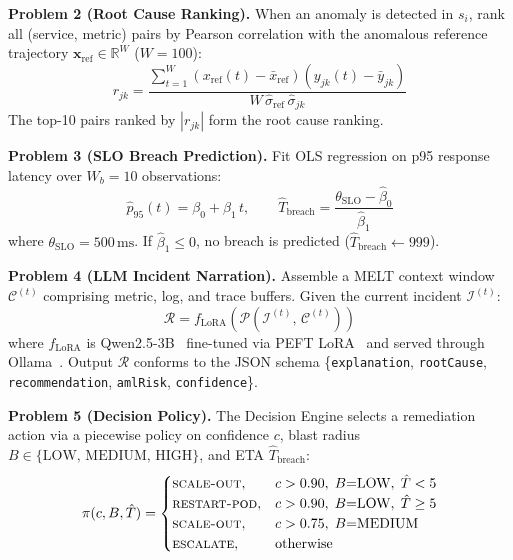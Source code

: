\documentclass[a4paper]{lipics-v2021}
\newcommand{\mypara}[1]{{\vspace{0.1mm}\noindent\textbf{#1}}}
\begin{document}
\mypara{Problem 2 (Root Cause Ranking).}
When an anomaly is detected in $s_i$, rank all (service, metric) pairs by Pearson
correlation with the anomalous reference trajectory
$\mathbf{x}_{\text{ref}} \in \mathbb{R}^W$ ($W{=}100$):
\begin{equation}
    r_{jk} = \frac{\displaystyle\sum_{t=1}^{W}\!\left(x_{\text{ref}}(t) -
    \bar{x}_{\text{ref}}\right)\!\left(y_{jk}(t) - \bar{y}_{jk}\right)}
    {W\,\hat{\sigma}_{\text{ref}}\,\hat{\sigma}_{jk}}
    \label{eq:rca}
\end{equation}
The top-10 pairs ranked by $|r_{jk}|$ form the root cause ranking.

\mypara{Problem 3 (SLO Breach Prediction).}
Fit OLS regression on p95 response latency over $W_b{=}10$ observations:
\begin{equation}
    \hat{p}_{95}(t) = \beta_0 + \beta_1\,t, \qquad
    \hat{T}_{\text{breach}} = \frac{\theta_{\text{SLO}} - \hat{\beta}_0}{\hat{\beta}_1}
    \label{eq:breach}
\end{equation}
where $\theta_{\text{SLO}} = 500\,\text{ms}$. If $\hat{\beta}_1 \leq 0$, no breach
is predicted ($\hat{T}_{\text{breach}} \leftarrow 999$).

\mypara{Problem 4 (LLM Incident Narration).}
Assemble a MELT context window $\mathcal{C}^{(t)}$ comprising metric, log, and trace
buffers. Given the current incident $\mathcal{I}^{(t)}$:
\begin{equation}
    \mathcal{R} = f_{\text{LoRA}}\!\left(\mathcal{P}\!\left(\mathcal{I}^{(t)},\,
    \mathcal{C}^{(t)}\right)\right)
    \label{eq:llm}
\end{equation}
where $f_{\text{LoRA}}$ is Qwen2.5-3B~\cite{qwen2024} fine-tuned via PEFT
LoRA~\cite{hu2022lora,peft2022} and served through Ollama~\cite{ollama2023}.
Output $\mathcal{R}$ conforms to the JSON schema
\{\texttt{explanation}, \texttt{rootCause}, \texttt{recommendation},
\texttt{amlRisk}, \texttt{confidence}\}.

\mypara{Problem 5 (Decision Policy).}
The Decision Engine selects a remediation action via a piecewise policy on
confidence $c$, blast radius $B \in \{\text{LOW, MEDIUM, HIGH}\}$, and ETA
$\hat{T}_{\text{breach}}$:
\begin{equation}
    \pi(c, B, \hat{T}) =
    \begin{cases}
      \textsc{scale-out},   & c > 0.90,\; B{=}\text{LOW},\; \hat{T} < 5 \\
      \textsc{restart-pod}, & c > 0.90,\; B{=}\text{LOW},\; \hat{T} \geq 5 \\
      \textsc{scale-out},   & c > 0.75,\; B{=}\text{MEDIUM} \\
      \textsc{escalate},    & \text{otherwise}
    \end{cases}
    \label{eq:policy}
\end{equation}
\end{document}
